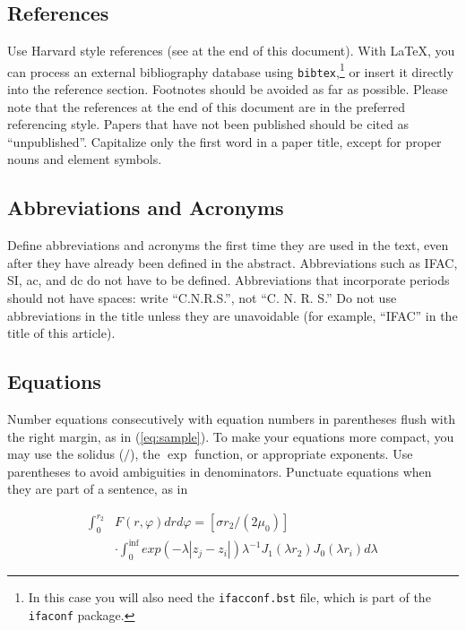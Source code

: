 \subsection{References}

Use Harvard style references (see at the end of this document). With
\LaTeX, you can process an external bibliography database 
using \texttt{bibtex},\footnote{In this case you will also need the \texttt{ifacconf.bst}
file, which is part of the \texttt{ifaconf} package.}
or insert it directly into the reference section. Footnotes should be avoided as
far as possible.  Please note that the references at the end of this
document are in the preferred referencing style. Papers that have not
been published should be cited as ``unpublished''.  Capitalize only the
first word in a paper title, except for proper nouns and element
symbols.

\subsection{Abbreviations and Acronyms}

Define abbreviations and acronyms the first time they are used in the
text, even after they have already been defined in the
abstract. Abbreviations such as IFAC, SI, ac, and dc do not have to be
defined. Abbreviations that incorporate periods should not have
spaces: write ``C.N.R.S.'', not ``C. N. R. S.'' Do not use abbreviations
in the title unless they are unavoidable (for example, ``IFAC'' in the
title of this article).

\subsection{Equations}

Number equations consecutively with equation numbers in parentheses
flush with the right margin, as in (\ref{eq:sample}).  To make your equations more
compact, you may use the solidus ($/$), the $\exp$ function, or
appropriate exponents. Use parentheses to avoid ambiguities in
denominators. Punctuate equations when they are part of a sentence, as
in

\begin{equation} \label{eq:sample2}
\begin{array}{ll}
\int_0^{r_2} & F (r, \varphi ) dr d\varphi = [\sigma r_2 / (2 \mu_0 )] \\
& \cdot \int_0^{\inf} exp(-\lambda |z_j - z_i |) \lambda^{-1} J_1 (\lambda  r_2 ) J_0 (\lambda r_i ) d\lambda 
\end{array}
\end{equation}

